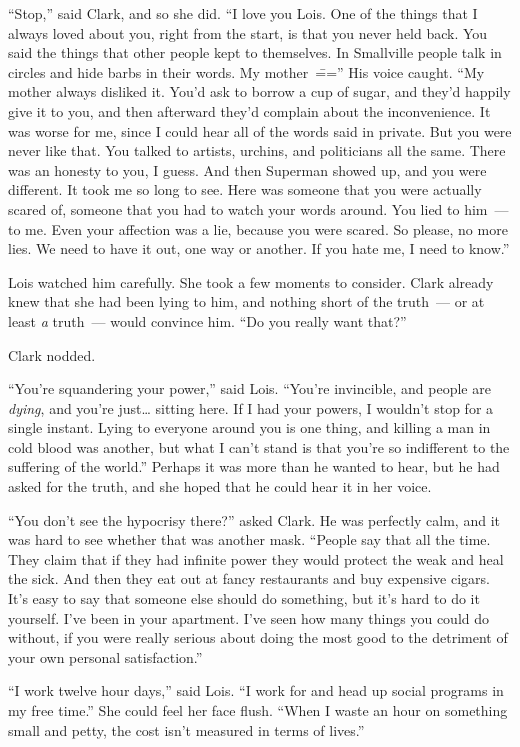 ``Stop,'' said Clark, and so she did. ``I love you Lois. One of the
things that I always loved about you, right from the start, is that you
never held back. You said the things that other people kept to
themselves. In Smallville people talk in circles and hide barbs in their
words. My mother~\==='' His voice caught. ``My mother always disliked it.
You'd ask to borrow a cup of sugar, and they'd happily give it to you,
and then afterward they'd complain about the inconvenience. It was worse
for me, since I could hear all of the words said in private. But you
were never like that. You talked to artists, urchins, and politicians
all the same. There was an honesty to you, I guess. And then Superman
showed up, and you were different. It took me so long to see. Here was
someone that you were actually scared of, someone that you had to watch
your words around. You lied to him~--- to me. Even your affection was a
lie, because you were scared. So please, no more lies. We need to have
it out, one way or another. If you hate me, I need to know.''

Lois watched him carefully. She took a few moments to consider. Clark
already knew that she had been lying to him, and nothing short of the
truth~--- or at least \emph{a} truth~--- would convince him. ``Do you
really want that?''

Clark nodded.

``You're squandering your power,'' said Lois. ``You're invincible, and
people are \emph{dying}, and you're just\ldots{} sitting here. If I had
your powers, I wouldn't stop for a single instant. Lying to everyone
around you is one thing, and killing a man in cold blood was another,
but what I can't stand is that you're so indifferent to the suffering of
the world.'' Perhaps it was more than he wanted to hear, but he had
asked for the truth, and she hoped that he could hear it in her voice.

``You don't see the hypocrisy there?'' asked Clark. He was perfectly
calm, and it was hard to see whether that was another mask. ``People say
that all the time. They claim that if they had infinite power they would
protect the weak and heal the sick. And then they eat out at fancy
restaurants and buy expensive cigars. It's easy to say that someone else
should do something, but it's hard to do it yourself. I've been in your
apartment. I've seen how many things you could do without, if you were
really serious about doing the most good to the detriment of your own
personal satisfaction.''

``I work twelve hour days,'' said Lois. ``I work for and head up social
programs in my free time.'' She could feel her face flush. ``When I
waste an hour on something small and petty, the cost isn't measured in
terms of lives.''

